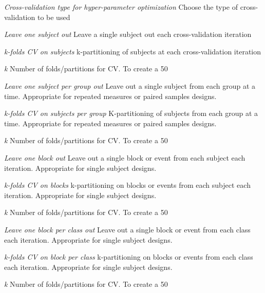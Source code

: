 \textit{Cross-validation type for hyper-parameter optimization}
Choose the type of cross-validation to be used


\textit{Leave one subject out}
Leave a single subject out each cross-validation iteration


\textit{k-folds CV on subjects}
k-partitioning of subjects at each cross-validation iteration


\textit{k}
Number of folds/partitions for CV. To create a 50%


\textit{Leave one subject per group out}
Leave out a single subject from each group at a time. Appropriate for repeated measures or paired samples designs.


\textit{k-folds CV on subjects per group}
K-partitioning of subjects from each group at a time. Appropriate for repeated measures or paired samples designs.


\textit{k}
Number of folds/partitions for CV. To create a 50%


\textit{Leave one block out}
Leave out a single block or event from each subject each iteration. Appropriate for single subject designs.


\textit{k-folds CV on blocks}
k-partitioning on blocks or events from each subject each iteration. Appropriate for single subject designs.


\textit{k}
Number of folds/partitions for CV. To create a 50%


\textit{Leave one block per class out}
Leave out a single block or event from each class each iteration. Appropriate for single subject designs.


\textit{k-folds CV on block per class}
k-partitioning on blocks or events from each class each iteration. Appropriate for single subject designs.


\textit{k}
Number of folds/partitions for CV. To create a 50%


